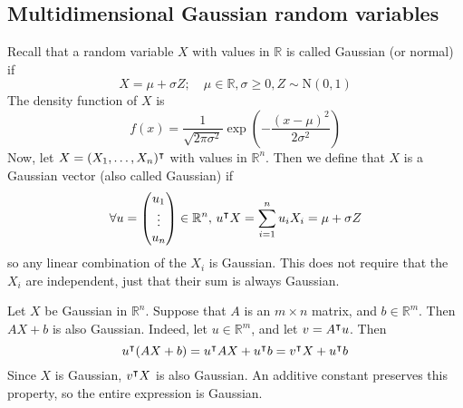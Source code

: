 \subsection{Multidimensional Gaussian random variables}
Recall that a random variable \(X\) with values in \(\mathbb R\) is called Gaussian (or normal) if
\[
	X = \mu + \sigma Z;\quad \mu \in \mathbb R, \sigma \geq 0, Z \sim \mathrm{N}(0, 1)
\]
The density function of \(X\) is
\[
	f(x) = \frac{1}{\sqrt{2\pi\sigma^2}} \exp(-\frac{(x-\mu)^2}{2\sigma^2})
\]
Now, let \(X = (X_1, \dots, X_n)^\intercal\) with values in \(\mathbb R^n\).
Then we define that \(X\) is a Gaussian vector (also called Gaussian) if
\[
	\forall u = \begin{pmatrix}
		u_1 \\ \vdots \\ u_n
	\end{pmatrix} \in \mathbb R^n,\, u^\intercal X = \sum_{i=1}^n u_i X_i = \mu + \sigma Z
\]
so any linear combination of the \(X_i\) is Gaussian.
This does not require that the \(X_i\) are independent, just that their sum is always Gaussian.

Let \(X\) be Gaussian in \(\mathbb R^n\).
Suppose that \(A\) is an \(m \times n\) matrix, and \(b \in \mathbb R^m\).
Then \(AX + b\) is also Gaussian.
Indeed, let \(u \in \mathbb R^m\), and let \(v = A^\intercal u\).
Then
\[
	u^\intercal(AX + b) = u^\intercal AX + u^\intercal b = v^\intercal X + u^\intercal b
\]
Since \(X\) is Gaussian, \(v^\intercal X\) is also Gaussian.
An additive constant preserves this property, so the entire expression is Gaussian.

